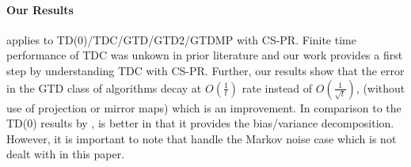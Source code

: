 \paragraph{Our Results}  applies to TD(0)/TDC/GTD/GTD2/GTDMP with CS-PR. Finite time performance of TDC was unkown in prior literature and our work provides a first step by understanding TDC with CS-PR. Further, our results show that the error in the GTD class of algorithms decay at $O(\frac{1}{t})$ rate instead of $O(\frac{1}{\sqrt{t}})$, (without use of projection or mirror maps) which is an improvement. In comparison to the TD(0) results by \citet{korda-prashanth},  is better in that it provides the bias/variance decomposition. However, it is important to note that \citet{korda-prashanth} handle the Markov noise case which is not dealt with in this paper.
\begin{comment}

\end{comment}
